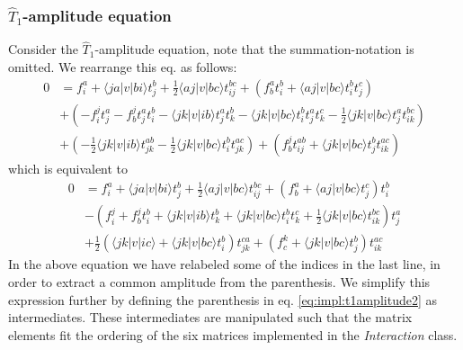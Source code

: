 \subsubsection{\bf $\hat{T}_1$-amplitude equation}
Consider the $\hat{T}_1$-amplitude equation, note that the summation-notation is omitted. We rearrange this eq. as follows:
\begin{align}
0&=f_i^a+ \langle ja|v|bi \rangle t_{j}^{b}+\frac{1}{2}\langle aj|v|bc\rangle t_{ij}^{bc}+\left( f_{b}^{a}t_{i}^{b}+\langle aj|v|bc\rangle t_i^bt_j^c\right )\nonumber\\
&+\left(-f_{i}^{j}t_{j}^{a}-f_b^jt_j^at_i^b-\langle jk|v|ib\rangle t_{j}^{a}t_{k}^{b}-\langle jk|v|bc\rangle t_i^bt_j^at_k^c-\frac{1}{2}\langle jk|v|bc\rangle t_j^at_{ik}^{bc} \right)\nonumber\\
&+\left(-\frac{1}{2}\langle jk|v|ib\rangle t_{jk}^{ab}-\frac{1}{2}\langle jk|v|bc\rangle t_i^bt_{jk}^{ac} \right)+ \left(f_{b}^{j}t_{ij}^{ab}+\langle jk|v|bc\rangle t_j^bt_{ik}^{ac}\right)
\label{eq:impl:t1amplitude1}
\end{align}
which is equivalent to
\begin{align}
0&=f_i^a+ \langle ja|v|bi \rangle t_{j}^{b}+\frac{1}{2}\langle aj|v|bc\rangle t_{ij}^{bc}+\left( f_{b}^{a}+\langle aj|v|bc\rangle t_j^c\right )t_i^b\nonumber\\
&-\left(f_{i}^{j}+f_b^jt_i^b+\langle jk|v|ib\rangle t_{k}^{b}+\langle jk|v|bc\rangle t_i^bt_k^c+\frac{1}{2}\langle jk|v|bc\rangle t_{ik}^{bc} \right)t_{j}^{a}\nonumber\\
&+\frac{1}{2}\left(\langle jk|v|ic\rangle +\langle jk|v|bc\rangle t_i^b\right)t_{jk}^{ca} + \left(f_{c}^{k}+\langle jk|v|bc\rangle t_j^b\right)t_{ik}^{ac}
\label{eq:impl:t1amplitude2}
\end{align}
In the above equation we have relabeled some of the indices in the last line, in order to extract a common amplitude from the parenthesis. We simplify this expression further by defining the parenthesis in eq. \ref{eq:impl:t1amplitude2} as intermediates. These intermediates are manipulated such that the matrix elements fit the ordering of the six matrices implemented in the \emph{Interaction} class.
